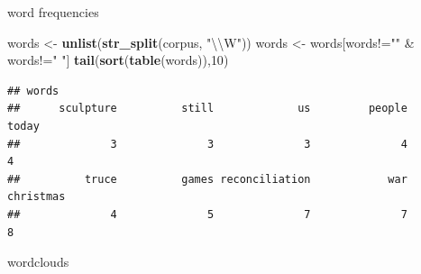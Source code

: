 \documentclass[ignorenonframetext,]{beamer}
\newenvironment{Shaded}{\begin{snugshade}}{\end{snugshade}}
\newcommand{\KeywordTok}[1]{\textcolor[rgb]{0.13,0.29,0.53}{\textbf{{#1}}}}
\newcommand{\DataTypeTok}[1]{\textcolor[rgb]{0.13,0.29,0.53}{{#1}}}
\newcommand{\DecValTok}[1]{\textcolor[rgb]{0.00,0.00,0.81}{{#1}}}
\newcommand{\CharTok}[1]{\textcolor[rgb]{0.31,0.60,0.02}{{#1}}}
\newcommand{\StringTok}[1]{\textcolor[rgb]{0.31,0.60,0.02}{{#1}}}
\newcommand{\NormalTok}[1]{{#1}}
\begin{document}
\begin{frame}[fragile]{word frequencies}

\begin{Shaded}
\begin{Highlighting}[]
\NormalTok{words <-}\StringTok{ }\KeywordTok{unlist}\NormalTok{(}\KeywordTok{str_split}\NormalTok{(corpus, }\StringTok{"}\CharTok{\textbackslash{}\textbackslash{}}\StringTok{W"}\NormalTok{))}
\NormalTok{words <-}\StringTok{ }\NormalTok{words[words!=}\StringTok{""} \NormalTok{&}\StringTok{ }\NormalTok{words!=}\StringTok{" "}\NormalTok{]}
\KeywordTok{tail}\NormalTok{(}\KeywordTok{sort}\NormalTok{(}\KeywordTok{table}\NormalTok{(words)),}\DecValTok{10}\NormalTok{)}
\end{Highlighting}
\end{Shaded}

\begin{verbatim}
## words
##      sculpture          still             us         people          today 
##              3              3              3              4              4 
##          truce          games reconciliation            war      christmas 
##              4              5              7              7              8
\end{verbatim}

\end{frame}

\begin{frame}[fragile]{wordclouds}

\begin{Shaded}
\end{Shaded}

\end{frame}
\end{document}
